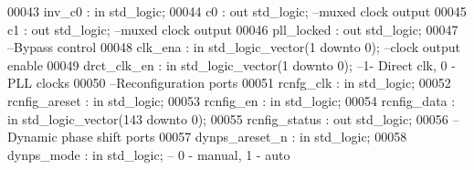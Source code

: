 \begin{DoxyCode}
00043    \textcolor{vhdlchar}{inv_c0}            \textcolor{vhdlchar}{:} \textcolor{keywordflow}{in} \textcolor{comment}{std\_logic};
00044    \textcolor{vhdlchar}{c0}                \textcolor{vhdlchar}{:} \textcolor{keywordflow}{out} \textcolor{comment}{std\_logic};\textcolor{keyword}{ --muxed clock output}
00045    \textcolor{vhdlchar}{c1}                \textcolor{vhdlchar}{:} \textcolor{keywordflow}{out} \textcolor{comment}{std\_logic};\textcolor{keyword}{ --muxed clock output}
00046    \textcolor{vhdlchar}{pll_locked}        \textcolor{vhdlchar}{:} \textcolor{keywordflow}{out} \textcolor{comment}{std\_logic};
00047 \textcolor{keyword}{   --Bypass control}
00048    \textcolor{vhdlchar}{clk_ena}           \textcolor{vhdlchar}{:} \textcolor{keywordflow}{in} \textcolor{comment}{std\_logic\_vector}\textcolor{vhdlchar}{(}\textcolor{vhdllogic}{}\textcolor{vhdllogic}{1} \textcolor{keywordflow}{downto} \textcolor{vhdllogic}{}\textcolor{vhdllogic}{0}\textcolor{vhdlchar}{)};\textcolor{keyword}{ --clock output enable}
00049    \textcolor{vhdlchar}{drct_clk_en}       \textcolor{vhdlchar}{:} \textcolor{keywordflow}{in} \textcolor{comment}{std\_logic\_vector}\textcolor{vhdlchar}{(}\textcolor{vhdllogic}{}\textcolor{vhdllogic}{1} \textcolor{keywordflow}{downto} \textcolor{vhdllogic}{}\textcolor{vhdllogic}{0}\textcolor{vhdlchar}{)};\textcolor{keyword}{ --1- Direct clk, 0 - PLL clocks }
00050 \textcolor{keyword}{   --Reconfiguration ports}
00051    \textcolor{vhdlchar}{rcnfg_clk}         \textcolor{vhdlchar}{:} \textcolor{keywordflow}{in} \textcolor{comment}{std\_logic};
00052    \textcolor{vhdlchar}{rcnfig_areset}     \textcolor{vhdlchar}{:} \textcolor{keywordflow}{in} \textcolor{comment}{std\_logic};
00053    \textcolor{vhdlchar}{rcnfig_en}         \textcolor{vhdlchar}{:} \textcolor{keywordflow}{in} \textcolor{comment}{std\_logic};
00054    \textcolor{vhdlchar}{rcnfig_data}       \textcolor{vhdlchar}{:} \textcolor{keywordflow}{in} \textcolor{comment}{std\_logic\_vector}\textcolor{vhdlchar}{(}\textcolor{vhdllogic}{}\textcolor{vhdllogic}{143} \textcolor{keywordflow}{downto} \textcolor{vhdllogic}{}\textcolor{vhdllogic}{0}\textcolor{vhdlchar}{)};
00055    \textcolor{vhdlchar}{rcnfig_status}     \textcolor{vhdlchar}{:} \textcolor{keywordflow}{out} \textcolor{comment}{std\_logic};
00056 \textcolor{keyword}{   --Dynamic phase shift ports}
00057    \textcolor{vhdlchar}{dynps_areset_n}    \textcolor{vhdlchar}{:} \textcolor{keywordflow}{in} \textcolor{comment}{std\_logic};
00058    \textcolor{vhdlchar}{dynps_mode}        \textcolor{vhdlchar}{:} \textcolor{keywordflow}{in} \textcolor{comment}{std\_logic};\textcolor{keyword}{ -- 0 - manual, 1 - auto}

\end{DoxyCode}
